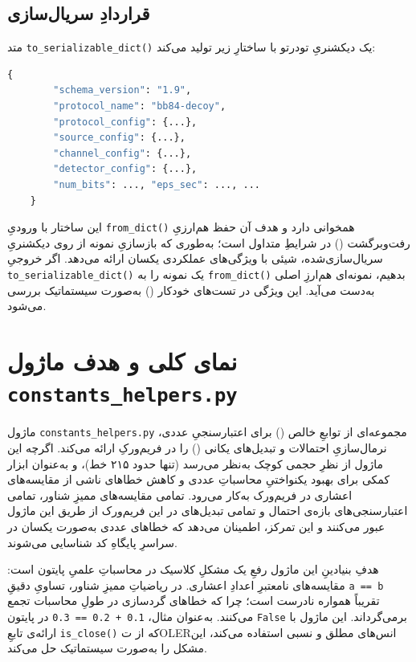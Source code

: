 \subsection{قراردادِ سریال‌سازی}

متد \texttt{to\_serializable\_dict()} یک دیکشنریِ تودرتو با ساختارِ زیر تولید می‌کند:

\begin{lstlisting}[language=Python]
	{
		"schema_version": "1.9",
		"protocol_name": "bb84-decoy",
		"protocol_config": {...},
		"source_config": {...},
		"channel_config": {...},
		"detector_config": {...},
		"num_bits": ..., "eps_sec": ..., ...
	}
\end{lstlisting}

این ساختار با ورودیِ \texttt{from\_dict()} همخوانی دارد و هدف آن حفظ هم‌ارزیِ رفت‌وبرگشت () در شرایطِ متداول است؛ به‌طوری که بازسازیِ نمونه از روی دیکشنریِ سریال‌سازی‌شده، شیئی با ویژگی‌های عملکردی یکسان ارائه می‌دهد. اگر خروجیِ \texttt{to\_serializable\_dict()} یک نمونه را به \texttt{from\_dict()} بدهیم، نمونه‌ای هم‌ارزِ اصلی به‌دست می‌آید. این ویژگی در تست‌های خودکار () به‌صورت سیستماتیک بررسی می‌شود.


\section{نمای کلی و هدف ماژول \texttt{constants\_helpers.py}}

ماژول \texttt{constants\_helpers.py} مجموعه‌ای از توابعِ خالص () برای اعتبارسنجیِ عددی، نرمال‌سازیِ احتمالات و تبدیل‌های یکانی () را در فریم‌ورکِ  ارائه می‌کند. اگرچه این ماژول از نظرِ حجمی کوچک به‌نظر می‌رسد (تنها حدود ۲۱۵ خط)، و به‌عنوان ابزار کمکی برای بهبود یکنواختیِ محاسباتِ عددی و کاهش خطاهای ناشی از مقایسه‌های اعشاری در فریم‌ورک به‌کار می‌رود. تمامی مقایسه‌های ممیزِ شناور، تمامی اعتبارسنجی‌های بازه‌ی احتمال و تمامی تبدیل‌های  در این فریم‌ورک از طریق این ماژول عبور می‌کنند و این تمرکز، اطمینان می‌دهد که خطاهای عددی به‌صورت یکسان در سراسرِ پایگاهِ کد شناسایی می‌شوند.

هدفِ بنیادینِ این ماژول رفعِ یک مشکلِ کلاسیک در محاسباتِ علمیِ پایتون است: مقایسه‌های نامعتبرِ اعدادِ اعشاری. در ریاضیاتِ ممیزِ شناور، تساویِ دقیقِ \texttt{a == b} تقریباً همواره نادرست است؛ چرا که خطاهای گردسازی در طولِ محاسبات تجمع می‌کنند. به‌عنوان مثال، \texttt{0.1 + 0.2 == 0.3} در پایتون \texttt{False} برمی‌گرداند. این ماژول با ارائه‌ی تابعِ \texttt{is\_close()} که از تOLERانس‌های مطلق و نسبی استفاده می‌کند، این مشکل را به‌صورت سیستماتیک حل می‌کند.

